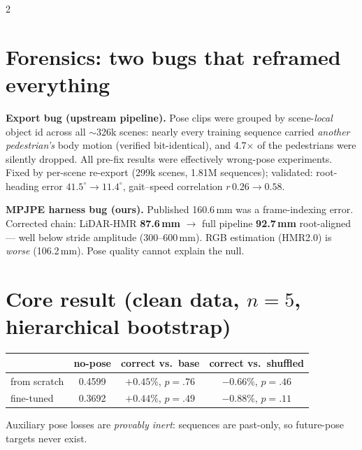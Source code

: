 \documentclass[9pt,a4paper]{extarticle}
\begin{document}
\begin{multicols}{2}

\section{Forensics: two bugs that reframed everything}
\textbf{Export bug (upstream pipeline).} Pose clips were grouped by scene-\emph{local} object id across all $\sim$326k scenes: nearly every training sequence carried \emph{another pedestrian's} body motion (verified bit-identical), and 4.7$\times$ of the pedestrians were silently dropped. All pre-fix results were effectively wrong-pose experiments. Fixed by per-scene re-export (299k scenes, 1.81M sequences); validated: root-heading error $41.5^\circ\!\to\!11.4^\circ$, gait--speed correlation $r\,0.26\!\to\!0.58$.

\textbf{MPJPE harness bug (ours).} Published 160.6\,mm was a frame-indexing error. Corrected chain: LiDAR-HMR \textbf{87.6\,mm} $\to$ full pipeline \textbf{92.7\,mm} root-aligned --- well below stride amplitude (300--600\,mm). RGB estimation (HMR2.0) is \emph{worse} (106.2\,mm). \textcolor{bad}{Pose quality cannot explain the null.}

\section{Core result (clean data, $n{=}5$, hierarchical bootstrap)}
\begin{center}\footnotesize
\begin{tabular}{lccc}
\toprule
& no-pose & correct vs.\ base & correct vs.\ shuffled \\
\midrule
from scratch & 0.4599 & $+0.45\%$, $p{=}.76$ & $-0.66\%$, $p{=}.46$ \\
fine-tuned & 0.3692 & $+0.44\%$, $p{=}.49$ & $-0.88\%$, $p{=}.11$ \\
\bottomrule
\end{tabular}
\end{center}
Auxiliary pose losses are \emph{provably inert}: sequences are past-only, so future-pose targets never exist.


\end{multicols}
\end{document}
